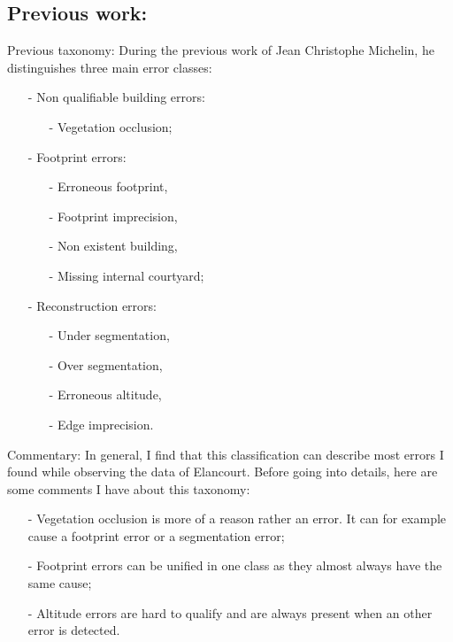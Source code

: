 \documentclass[9pt]{beamer}
\begin{document}
	\subsection[Previous]{Previous work:}
	\begin{frame}{Previous taxonomy:}
		During the previous work of Jean Christophe Michelin, he distinguishes three main error classes:
		\begin{itemize}
			\item[-] Non qualifiable building errors:
			\begin{itemize}
				\item[-] Vegetation occlusion;
			\end{itemize}
			\item[-] Footprint errors:
			\begin{itemize}
				\item[-] Erroneous footprint,
				\item[-] Footprint imprecision,
				\item[-] Non existent building,
				\item[-] Missing internal courtyard;
			\end{itemize}
			\item[-] Reconstruction errors:
			\begin{itemize}
				\item[-] Under segmentation,
				\item[-] Over segmentation,
				\item[-] Erroneous altitude,
				\item[-] Edge imprecision.
			\end{itemize}
		\end{itemize}
	\end{frame}
	
	\begin{frame}{Commentary:}
		In general, I find that this classification can describe most errors I found while observing the data of Elancourt. Before going into details, here are some comments I have about this taxonomy:
		\begin{itemize}
			\item[-] Vegetation occlusion is more of a reason rather an error. It can for example cause a footprint error or a segmentation error;
			\item[-] Footprint errors can be unified in one class as they almost always have the same cause;
			\item[-] Altitude errors are hard to qualify and are always present when an other error is detected.
		\end{itemize}
	\end{frame}
\end{document}

